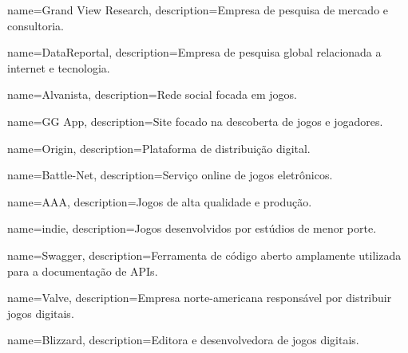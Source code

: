  {
    name=Grand View Research,
    description={Empresa de pesquisa de mercado e consultoria.}
}

 {
    name=DataReportal,
    description={Empresa de pesquisa global relacionada a internet e tecnologia.}
}

 {
    name=Alvanista,
    description={Rede social focada em jogos.}
}

 {
    name=GG App,
    description={Site focado na descoberta de jogos e jogadores.}
}

 {
    name=Origin,
    description={Plataforma de distribuição digital.}
}

 {
    name=Battle-Net,
    description={Serviço online de jogos eletrônicos.}
}

 {
    name=AAA,
    description={Jogos de alta qualidade e produção.}
}

 {
    name=indie,
    description={Jogos desenvolvidos por estúdios de menor porte.}
}

 {
    name=Swagger,
    description={Ferramenta de código aberto amplamente utilizada para a documentação de APIs.}
}

 {
    name=Valve,
    description={Empresa norte-americana responsável por distribuir jogos digitais.}
}

 {
    name=Blizzard,
    description={Editora e desenvolvedora de jogos digitais.}
}


